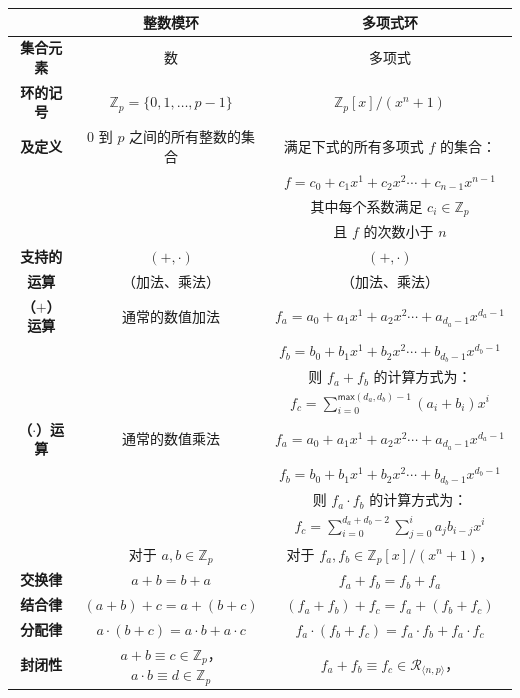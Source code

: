 \begin{table}[h]
\centering
\footnotesize
\begin{tabular}{|c||c|c|} %
\hline
&\textbf{整数模环} & \textbf{多项式环} \\
\hline
\hline
\textbf{{集合元素}} & 数 & 多项式 \\
\hline
\textbf{{环的记号}} & $\mathbb{Z}_p = \{0, 1, \ldots, p - 1\}$ & $\mathbb{Z}_p[x] / (x^n + 1)$ \\
\textbf{{及定义}} & $0$ 到 $p$ 之间的所有整数的集合 & 满足下式的所有多项式 $f$ 的集合：\\
&& $f= c_0 + c_1x^1 + c_2x^2 \cdots + c_{n-1}x^{n-1}$ \\
&& 其中每个系数满足 $c_i \in \mathbb{Z}_p$ \\
&& 且 $f$ 的次数小于 $n$ \\
\hline
\textbf{{支持的}}&$(+, \cdot)$& $(+, \cdot)$ \\
\textbf{{运算}}&（加法、乘法）&（加法、乘法）\\
\hline
\textbf{{（$+$）运算}} & 通常的数值加法 & $f_a = a_0 + a_1x^1 + a_2x^2 \cdots + a_{d_a-1}x^{d_a-1}$ \\
 & & $f_b = b_0 + b_1x^1 + b_2x^2 \cdots + b_{d_b-1}x^{d_b-1}$ \\
&& 则 $f_a + f_b$ 的计算方式为：\\
 & & $f_c = \sum\limits_{i=0}^{\textsf{max}(d_a,d_b)-1}(a_i+b_i)x^i$ \\
\hline
\textbf{{（$\cdot$）运算}} & 通常的数值乘法 & $f_a = a_0 + a_1x^1 + a_2x^2 \cdots + a_{d_a-1}x^{d_a-1}$ \\
 & & $f_b = b_0 + b_1x^1 + b_2x^2 \cdots + b_{d_b-1}x^{d_b-1}$ \\
&& 则 $f_a \cdot f_b$ 的计算方式为：\\
 & & $f_c = \sum\limits_{i=0}^{d_a+d_b-2}\sum\limits_{j=0}^{i}a_jb_{i-j}x^i$ \\
\hline
& 对于 $a, b \in \mathbb{Z}_p$ & 对于 $f_a, f_b \in \mathbb{Z}_p[x]/(x^n + 1)$，\\
\textbf{{交换律}} & $ a + b = b + a$ & $f_a + f_b = f_b + f_a$\\
\textbf{{结合律}} & $(a + b) + c = a + (b + c)$ & $(f_a + f_b) + f_c = f_a + (f_b + f_c)$\\
\textbf{{分配律}} & $a \cdot (b + c) = a\cdot b + a\cdot c$ & $f_a \cdot (f_b + f_c) = f_a\cdot f_b + f_a\cdot f_c$\\
\textbf{{封闭性}}& $a + b \equiv c \in \mathbb{Z}_p$，$a \cdot b \equiv d \in \mathbb{Z}_p$ & $f_a + f_b \equiv f_c \in \mathcal{R}_{\langle n, p \rangle}$，\\

\end{tabular}
\end{table}
